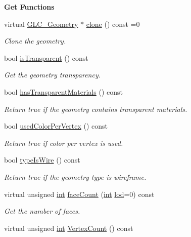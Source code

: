 \begin{Indent}{\bf Get Functions}
\begin{DoxyCompactItemize}
virtual \hyperlink{class_g_l_c___geometry}{G\-L\-C\-\_\-\-Geometry} $\ast$ \hyperlink{class_g_l_c___geometry_adb1db203e8a151666595c93d7a72bce6}{clone} () const =0
\begin{DoxyCompactList}\small\item\em Clone the geometry. \end{DoxyCompactList}\item 
bool \hyperlink{class_g_l_c___geometry_ae11d38de66a5ad4458f8dfdddb868483}{is\-Transparent} () const 
\begin{DoxyCompactList}\small\item\em Get the geometry transparency. \end{DoxyCompactList}\item 
bool \hyperlink{class_g_l_c___geometry_ae7871358f69825a4bd528fecb912de46}{has\-Transparent\-Materials} () const 
\begin{DoxyCompactList}\small\item\em Return true if the geometry contains transparent materials. \end{DoxyCompactList}\item 
bool \hyperlink{class_g_l_c___geometry_a5289d98d2262f65dadbfe1caf75ea7f1}{used\-Color\-Per\-Vertex} () const 
\begin{DoxyCompactList}\small\item\em Return true if color per vertex is used. \end{DoxyCompactList}\item 
bool \hyperlink{class_g_l_c___geometry_a505da8adb55e18f86b6b71e6fd3e855d}{type\-Is\-Wire} () const 
\begin{DoxyCompactList}\small\item\em Return true if the geometry type is wireframe. \end{DoxyCompactList}\item 
virtual unsigned \hyperlink{ioapi_8h_a787fa3cf048117ba7123753c1e74fcd6}{int} \hyperlink{class_g_l_c___geometry_aa297e3e3f3464cbf71d706f3a91d7a8b}{face\-Count} (\hyperlink{ioapi_8h_a787fa3cf048117ba7123753c1e74fcd6}{int} \hyperlink{glext_8h_a5b5a34b88a28ab9c203c2b432f6168b6}{lod}=0) const 
\begin{DoxyCompactList}\small\item\em Get the number of faces. \end{DoxyCompactList}\item 
virtual unsigned \hyperlink{ioapi_8h_a787fa3cf048117ba7123753c1e74fcd6}{int} \hyperlink{class_g_l_c___geometry_a2d3e8b43718288b7e9bf87ca34c65bf7}{Vertex\-Count} () const 

\end{DoxyCompactItemize}
\end{Indent}
